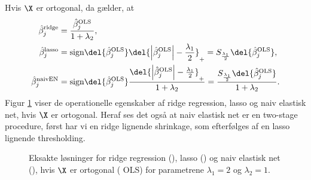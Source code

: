 \begin{lem}
Hvis \(\X\) er ortogonal, da gælder, at
\begin{align}
\hat{\beta}_j^\text{ridge} &= \frac{\hat{\beta}_j^\text{OLS}}{1+\lambda_2}, \label{eq:orto_ridge} \\
\hat{\beta}_j^\text{lasso} &= \text{sign} \del{\hat{\beta}_j^\text{OLS}} \del{\left\vert \hat{\beta}_j^\text{OLS} \right\vert - \frac{\lambda_1}{2}}_+ =S_{\frac{\lambda_1}{2}} \del{ \hat{\beta}_j^\text{OLS}}, \label{eq:orto_lasso} \\
\hat{\beta}_j^\text{naivEN} &= \text{sign} \del{\hat{\beta}_j^\text{OLS}} \frac{\del{\left\vert \hat{\beta}_j^\text{OLS} \right\vert - \frac{\lambda_1}{2}}_+}{1+\lambda_2} = \frac{S_{\frac{\lambda_1}{2}} \del{ \hat{\beta}_j^\text{OLS}} }{1+\lambda_2} . \label{eq:orto_naivEN}
\end{align}
Figur \ref{fig:elastisk2} viser de operationelle egenskaber af ridge regression, lasso og naiv elastisk net, hvis \(\X\) er ortogonal. Heraf ses det også at naiv elastisk net er en two-stage procedure, først har vi en ridge lignende shrinkage, som efterfølges af en lasso lignende thresholding.
%
\begin{figure}[H]
\centering
\scalebox{0.8}{}
\caption[optional short text]{Eksakte løsninger for ridge regression (), lasso () og naiv elastisk net (), hvis \(\X\) er ortogonal ( OLS) for parametrene \(\lambda_1=2\) og \(\lambda_2=1\).} \label{fig:elastisk2}
\end{figure}
%
\end{lem}
%
